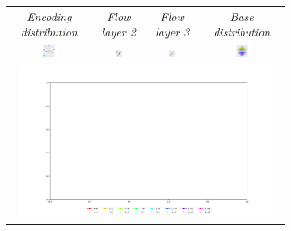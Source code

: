 \begin{figure}[t!]
    \centering
    \begin{subfigure}{\textwidth}
        \centering
        \begin{tabular}{cccc}
            \textit{Encoding distribution} &
            \textit{Flow layer 2} & 
            \textit{Flow layer 3} & 
            \textit{Base distribution} \\
            \includegraphics[width=0.225\textwidth]{figures/experiments_figures/latent_space/set_modeling/layer_forward_01.pdf} & 
            \includegraphics[width=0.225\textwidth]{figures/experiments_figures/latent_space/set_modeling/layer_forward_07.pdf}  & 
            \includegraphics[width=0.225\textwidth]{figures/experiments_figures/latent_space/set_modeling/layer_forward_10.pdf}  & 
            \includegraphics[width=0.225\textwidth]{figures/experiments_figures/latent_space/set_modeling/layer_forward_13.pdf}
            \\
            \multicolumn{4}{c}{\includegraphics[width=0.95\textwidth]{figures/experiments_figures/latent_space/set_modeling/legend_visu.pdf}}\\

\end{tabular}
\end{subfigure}
\end{figure}
